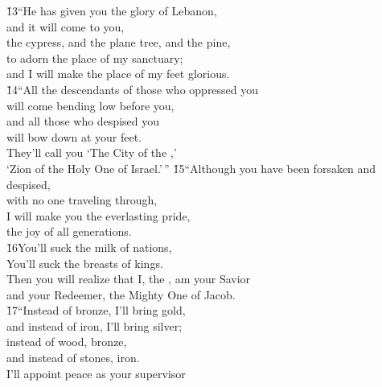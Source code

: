 \begin{poetry}
\poeml \v{13}``He has given you the glory of Lebanon, \\
\poemll    and it will come to you, \\
\poemlll       the cypress, and the plane tree, and the pine, \\
\poeml to adorn the place of my sanctuary; \\
\poemll    and I will make the place of my feet glorious. \\
\poeml \v{14}``All the descendants of those who oppressed you \\
\poemll    will come bending low before you, \\
\poeml and all those who despised you \\
\poemll    will bow down at your feet. \\
\poeml They'll call you `The City of the ,' \\
\poemll    `Zion of the Holy One of Israel.'\,''
\poeml \v{15}``Although you have been forsaken and despised, \\
\poemll    with no one traveling through, \\
\poeml I will make you the everlasting pride, \\
\poemll    the joy of all generations. \\
\poeml \v{16}You'll suck the milk of nations, \\
\poemll    You'll suck the breasts of kings. \\
\poeml Then you will realize that I, the , am your Savior \\
\poemll    and your Redeemer, the Mighty One of Jacob. \\
\poeml \v{17}``Instead of bronze, I'll bring gold, \\
\poemll    and instead of iron, I'll bring silver; \\
\poeml instead of wood, bronze, \\
\poemll    and instead of stones, iron. \\
\poeml I'll appoint peace as your supervisor \\

\end{poetry}
